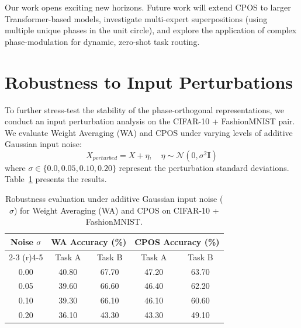 \documentclass{article}
\theoremstyle{plain}
\theoremstyle{definition}
\theoremstyle{remark}
\begin{document}
Our work opens exciting new horizons. Future work will extend CPOS to larger Transformer-based models, investigate multi-expert superpositions (using multiple unique phases in the unit circle), and explore the application of complex phase-modulation for dynamic, zero-shot task routing.

\nocite{*}



\newpage
\appendix
\onecolumn

\section{Robustness to Input Perturbations}
\label{subsec:robustness}
To further stress-test the stability of the phase-orthogonal representations, we conduct an input perturbation analysis on the CIFAR-10 + FashionMNIST pair. We evaluate Weight Averaging (WA) and CPOS under varying levels of additive Gaussian input noise:
\begin{equation}
X_{perturbed} = X + \eta, \quad \eta \sim \mathcal{N}(0, \sigma^2 \mathbf{I})
\end{equation}
where $\sigma \in \{0.0, 0.05, 0.10, 0.20\}$ represent the perturbation standard deviations. Table~\ref{tab:robustness} presents the results.

\begin{table}[h]
\caption{Robustness evaluation under additive Gaussian input noise ($\sigma$) for Weight Averaging (WA) and CPOS on CIFAR-10 + FashionMNIST.}
\label{tab:robustness}
\begin{center}
\begin{small}
\begin{sc}
\begin{tabular}{ccccc}
\toprule
Noise $\sigma$ & \multicolumn{2}{c}{WA Accuracy (\%)} & \multicolumn{2}{c}{CPOS Accuracy (\%)} \\
\cmidrule(r){2-3} \cmidrule(r){4-5}
& Task A & Task B & Task A & Task B \\
\midrule
0.00 & 40.80 & 67.70 & 47.20 & 63.70 \\
0.05 & 39.60 & 66.60 & 46.40 & 62.20 \\
0.10 & 39.30 & 66.10 & 46.10 & 60.60 \\
0.20 & 36.10 & 43.30 & 43.30 & 49.10 \\
\bottomrule
\end{tabular}
\end{sc}
\end{small}
\end{center}
\end{table}
\end{document}
